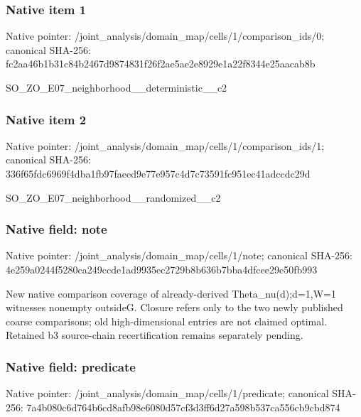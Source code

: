 \documentclass[10pt,a4paper]{article}
\begin{document}
\subsubsection{Native item 1}
Native pointer: /joint\_\allowbreak{}analysis/domain\_\allowbreak{}map/cells/1/comparison\_\allowbreak{}ids/0; canonical SHA-256: fc2aa46b1b31c84b2467d9874831f26f2ae5ae2e8929e1a22f8344e25aacab8b

\begingroup\raggedright\sloppy SO\_\allowbreak{}ZO\_\allowbreak{}E07\_\allowbreak{}neighborhood\_\allowbreak{}\_\allowbreak{}deterministic\_\allowbreak{}\_\allowbreak{}c2\par\endgroup

\subsubsection{Native item 2}
Native pointer: /joint\_\allowbreak{}analysis/domain\_\allowbreak{}map/cells/1/comparison\_\allowbreak{}ids/1; canonical SHA-256: 336f65fdc6969f4dba1fb97faeed9e77e957c4d7c73591fc951ec41adccdc29d

\begingroup\raggedright\sloppy SO\_\allowbreak{}ZO\_\allowbreak{}E07\_\allowbreak{}neighborhood\_\allowbreak{}\_\allowbreak{}randomized\_\allowbreak{}\_\allowbreak{}c2\par\endgroup

\subsubsection{Native field: note}
Native pointer: /joint\_\allowbreak{}analysis/domain\_\allowbreak{}map/cells/1/note; canonical SHA-256: 4e259a0244f5280ca249ccde1ad9935ec2729b8b636b7bba4dfcee29e50fb993

\begingroup\raggedright\sloppy New native comparison coverage of already-derived Theta\_\allowbreak{}nu(d);\allowbreak{}d=\allowbreak{}1,\allowbreak{}W=\allowbreak{}1 witnesses nonempty outsideG. Closure refers only to the two newly published coarse comparisons;\allowbreak{} old high-dimensional entries are not claimed optimal. Retained b3 source-chain recertification remains separately pending.\par\endgroup

\subsubsection{Native field: predicate}
Native pointer: /joint\_\allowbreak{}analysis/domain\_\allowbreak{}map/cells/1/predicate; canonical SHA-256: 7a4b080c6d764b6cd8afb98e6080d57cf3d3ff6d27a598b537ca556cb9cbd874
\end{document}
